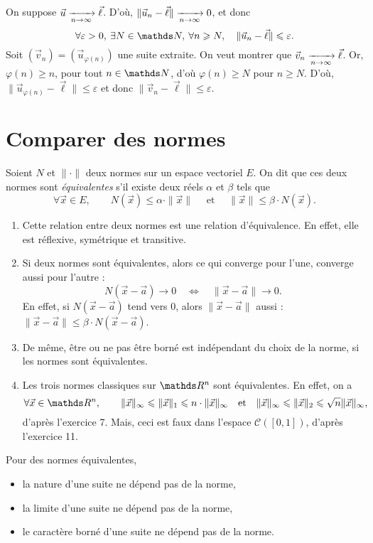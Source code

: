 \begin{prv}
	On suppose $\vec{u} \xrightarrow[n\to \infty]{} \vec{\ell}$. D'où, $\|\vec{u}_n - \vec{\ell}\| \xrightarrow[n\to \infty]{} 0$, et donc \[
		\forall \varepsilon > 0,\: \exists N \in \N,\: \forall n \ge N, \quad \|\vec{u}_n - \vec{\ell}\| \le \varepsilon
	.\] Soit $(\vec{v}_n) = (\vec{u}_{\varphi(n)})$\/ une suite extraite. On veut montrer que $\vec{v}_n \xrightarrow[n\to \infty]{} \vec{\ell}$.
	Or, $\varphi(n) \ge n$, pour tout $n \in \N$, d'où $\varphi(n) \ge N$\/ pour $n \ge N$. D'où, $\|\vec{u}_{\varphi(n)} - \vec{\ell}\| \le \varepsilon$\/ et donc $\|\vec{v}_n - \vec{\ell}\| \le \varepsilon$.
\end{prv}

\section{Comparer des normes}

\begin{defn}
	Soient $N$\/ et $\|\cdot\|$\/ deux normes sur un espace vectoriel $E$.
	On dit que ces deux normes sont \textit{équivalentes} s'il existe deux réels $\alpha$\/ et $\beta$\/ tels que \[
		\forall \vec{x} \in E,\quad\quad N(\vec{x}) \le \alpha\cdot \|\vec{x}\|\quad \text{ et }\quad \|\vec{x}\| \le \beta \cdot N(\vec{x})
	.\]
\end{defn}

\begin{rmk}
	\begin{enumerate}
		\item Cette relation entre deux normes est une relation d'équivalence. En effet, elle est réflexive, symétrique et transitive.
		\item Si deux normes sont équivalentes, alors ce qui converge pour l'une, converge aussi pour l'autre : \[
				N(\vec{x} - \vec{a}) \to 0 \quad \iff \quad \|\vec{x} - \vec{a}\| \to 0
			.\] En effet, si $N(\vec{x} - \vec{a})$\/ tend vers 0, alors $\|\vec{x}-\vec{a}\|$\/ aussi : $\|\vec{x} - \vec{a}\| \le \beta\cdot N(\vec{x}-\vec{a})$.
		\item De même, être ou ne pas être borné est indépendant du choix de la norme, si les normes sont équivalentes.
		\item Les trois normes classiques sur $\R^n$\/ sont équivalentes. En effet, on a \[
			\forall \vec{x} \in \R^n, \quad\quad \|\vec{x}\|_\infty \le \|\vec{x}\|_1 \le n \cdot \|\vec{x}\|_\infty \quad \text{et}\quad \|\vec{x}\|_\infty \le \|\vec{x}\|_2 \le \sqrt{n} \|\vec{x}\|_\infty,
		\] d'après l'exercice 7. Mais, ceci est faux dans l'espace $\mathcal{C}([0,1])$, d'après l'exercice 11.
	\end{enumerate}

	Pour des normes équivalentes,
	\begin{itemize}
		\item la nature d'une suite ne dépend pas de la norme,
		\item la limite d'une suite ne dépend pas de la norme,
		\item le caractère borné d'une suite ne dépend pas de la norme.
	\end{itemize}
\end{rmk}

